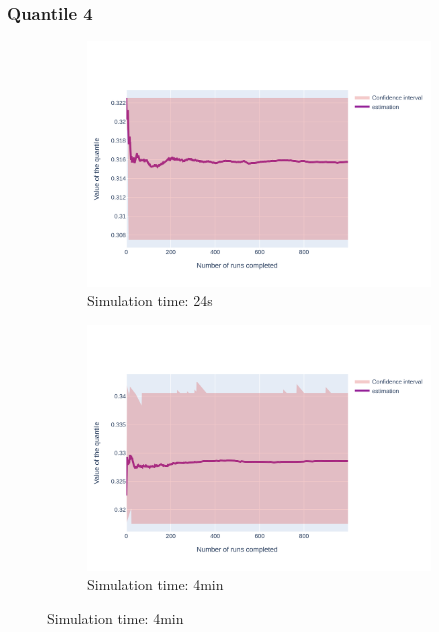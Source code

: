 \documentclass{article}
\begin{document}
\subsubsection{Quantile 4}
\begin{figure}[H]
    \centering
    \begin{subfigure}{.495\textwidth}
        \centering
        \includegraphics[width=\textwidth]{../fig/quantile4/CC1: CAM2 --> ECU2_24s.png}
        \caption{Simulation time: 24s}
        \vspace{.5cm}
    \end{subfigure}
    \begin{subfigure}{.495\textwidth}
        \centering
        \includegraphics[width=\textwidth]{../fig/quantile4/CC1: CAM2 --> ECU2_4mn.png}
        \caption{Simulation time: 4min}

\end{subfigure}
\end{figure}
\end{document}
